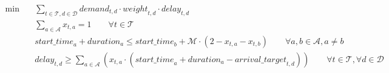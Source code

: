 \begin{align}
  \min\quad & \sum_{t \in \mathcal{T}, d \in \mathcal{D}} \mathit{demand}_{t,d} \cdot \mathit{weight}_{t,d} \cdot \mathit{delay}_{t,d} \tag{total\_weighted\_delay} \\
  & \sum_{a \in \mathcal{A}} x_{t,a} = 1 \qquad \forall t \in \mathcal{T} \tag{assign\_train} \\
  & \mathit{start\_time}_{a} + \mathit{duration}_{a} \le \mathit{start\_time}_{b} + \mathcal{M} \cdot (2 - x_{t,a} - x_{t,b}) \qquad \forall a, b \in \mathcal{A}, a \neq b \tag{arc\_precedence} \\
  & \mathit{delay}_{t,d} \ge \sum_{a \in \mathcal{A}} (x_{t,a} \cdot (\mathit{start\_time}_{a} + \mathit{duration}_{a} - \mathit{arrival\_target}_{t,d})) \qquad \forall t \in \mathcal{T}, \forall d \in \mathcal{D} \tag{delay\_calc} \\
\end{align}